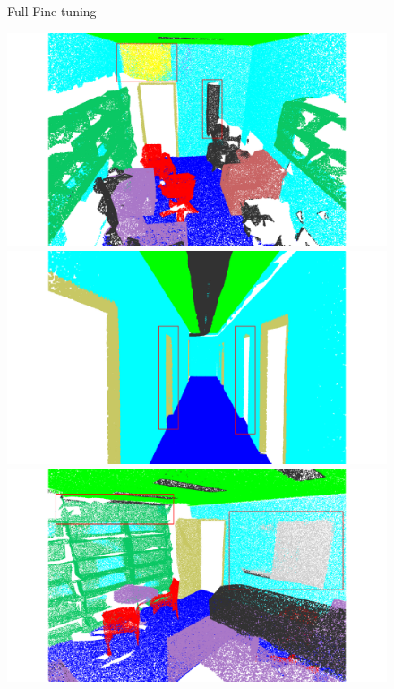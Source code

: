 \begin{figure}[htbp]
    \centering

    \begin{minipage}{0.09\textwidth}
        \centering
        Full
        Fine-tuning
    \end{minipage}
    \hfill
    \begin{minipage}{0.22\textwidth}
        \centering
        \includegraphics[width=\textwidth]{fig/supplement/semantic_segmentation/office_9/PT_office_9.pdf}
    \end{minipage}
    \hfill
    \begin{minipage}{0.22\textwidth}
        \centering
        \includegraphics[width=\textwidth]{fig/supplement/semantic_segmentation/hallway_10/PT_hallway_10.pdf} %
    \end{minipage}
    \hfill
    \begin{minipage}{0.22\textwidth}
        \centering
        \includegraphics[width=\textwidth]{fig/supplement/semantic_segmentation/office_35/PT_office_35.pdf}

\end{minipage}
\end{figure}
